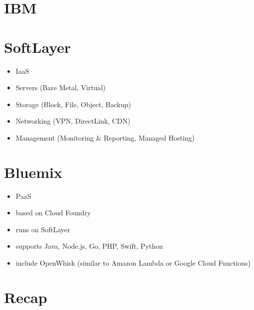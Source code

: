 \documentclass[presentation]{beamer}
\begin{document}
\section*{IBM}
\label{sec:org6c160db}
\section*{SoftLayer}
\label{sec:org6a69d5c}
\begin{itemize}
\item IaaS
\item Servers (Bare Metal, Virtual)
\item Storage (Block, File, Object, Backup)
\item Networking (VPN, DirectLink, CDN)
\item Management (Monitoring \& Reporting, Managed Hosting)
\end{itemize}
\section*{Bluemix}
\label{sec:org9ac9f7d}
\begin{itemize}
\item PaaS
\item based on Cloud Foundry
\item runs on SoftLayer
\item supports Java, Node.js, Go, PHP, Swift, Python
\item include OpenWhisk (similar to Amazon Lambda or Google Cloud Functions)
\end{itemize}
\section*{Recap}
\label{sec:orgd72a7d5}
\end{document}
